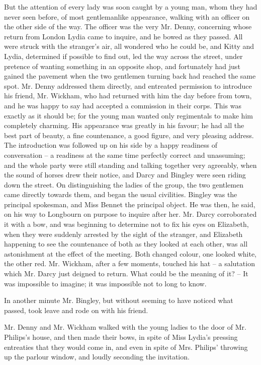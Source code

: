 But the attention of every lady was soon caught by
a young man, whom they had never seen before, of most
gentlemanlike appearance, walking with an officer on the
other side of the way. The officer was the very Mr. Denny,
concerning whose return from London Lydia came to
inquire, and he bowed as they passed. All were struck
with the stranger’s air, all wondered who he could be, and
Kitty and Lydia, determined if possible to find out, led
the way across the street, under pretence of wanting
something in an opposite shop, and fortunately had just
gained the pavement when the two gentlemen turning
back had reached the same spot. Mr. Denny addressed
them directly, and entreated permission to introduce his
friend, Mr. Wickham, who had returned with him the day
before from town, and he was happy to say had accepted
a commission in their corps. This was exactly as it should
be; for the young man wanted only regimentals to make
him completely charming. His appearance was greatly
in his favour; he had all the best part of beauty, a fine
countenance, a good figure, and very pleasing address.
The introduction was followed up on his side by a happy
readiness of conversation -- a readiness at the same time
perfectly correct and unassuming; and the whole party
were still standing and talking together very agreeably,
when the sound of horses drew their notice, and Darcy
and Bingley were seen riding down the street. On distinguishing
the ladies of the group, the two gentlemen
came directly towards them, and began the usual civilities.
Bingley was the principal spokesman, and Miss Bennet the
principal object. He was then, he said, on his way to
Longbourn on purpose to inquire after her. Mr. Darcy
corroborated it with a bow, and was beginning to determine
not to fix his eyes on Elizabeth, when they were
suddenly arrested by the sight of the stranger, and
Elizabeth happening to see the countenance of both as
they looked at each other, was all astonishment at the
effect of the meeting. Both changed colour, one looked
white, the other red. Mr. Wickham, after a few moments,
touched his hat -- a salutation which Mr. Darcy just
deigned to return. What could be the meaning of it? -- It
was impossible to imagine; it was impossible not to
long to know.

In another minute Mr. Bingley, but without seeming
to have noticed what passed, took leave and rode on with
his friend.

Mr. Denny and Mr. Wickham walked with the young
ladies to the door of Mr. Philips’s house, and then made
their bows, in spite of Miss Lydia’s pressing entreaties
that they would come in, and even in spite of Mrs. Philips’
throwing up the parlour window, and loudly seconding the
invitation.

